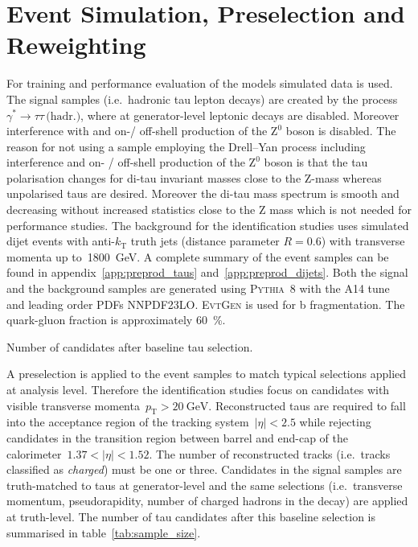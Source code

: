 \section{Event Simulation, Preselection and Reweighting}
\label{sec:bdt_eventsim}


For training and performance evaluation of the models simulated data is used.
The signal samples (i.e.\ hadronic tau lepton decays) are created by the process
$\gamma^* \rightarrow \tau \tau \, \text{(hadr.)}$, where at generator-level
leptonic decays are disabled. Moreover interference with and on-/ off-shell
production of the $\mathrm{Z}^0$ boson is disabled. The reason for not using a
sample employing the Drell--Yan process including interference and on- /
off-shell production of the $\mathrm{Z}^0$ boson is that the tau polarisation
changes for di-tau invariant masses close to the $\mathrm{Z}$-mass whereas
unpolarised taus are desired. Moreover the di-tau mass spectrum is smooth and
decreasing without increased statistics close to the $\mathrm{Z}$ mass which is
not needed for performance studies. The background for the identification
studies uses simulated dijet events with anti-$k_\text{T}$ truth jets (distance
parameter $R = 0.6$) with transverse momenta up
to~\SI{1800}{\giga\electronvolt}. A complete summary of the event samples can be
found in appendix~\ref{app:preprod_taus} and~\ref{app:preprod_dijets}. Both the
signal and the background samples are generated using \textsc{Pythia}~8 with the
A14 tune and leading order PDFs NNPDF23LO. \textsc{EvtGen} is used for b
fragmentation. The quark-gluon fraction is approximately \SI{60}{\percent}.

\begin{table}[htb]
  \centering
  
  \caption{Number of candidates after baseline tau selection.}
  \label{tab:sample_size}
\end{table}

A preselection is applied to the event samples to match typical selections
applied at analysis level. Therefore the identification studies focus on
candidates with visible transverse
momenta~$p_\text{T} > \SI{20}{\giga\electronvolt}$. Reconstructed taus are
required to fall into the acceptance region of the tracking
system~$|\eta| < 2.5$ while rejecting candidates in the transition region
between barrel and end-cap of the calorimeter~$1.37 < |\eta| < 1.52$. The number
of reconstructed tracks (i.e.\ tracks classified as \emph{charged}) must be one
or three. Candidates in the signal samples are truth-matched to taus at
generator-level and the same selections (i.e.\ transverse momentum,
pseudorapidity, number of charged hadrons in the decay) are applied at
truth-level. The number of tau candidates after this baseline selection is
summarised in table~\ref{tab:sample_size}.

